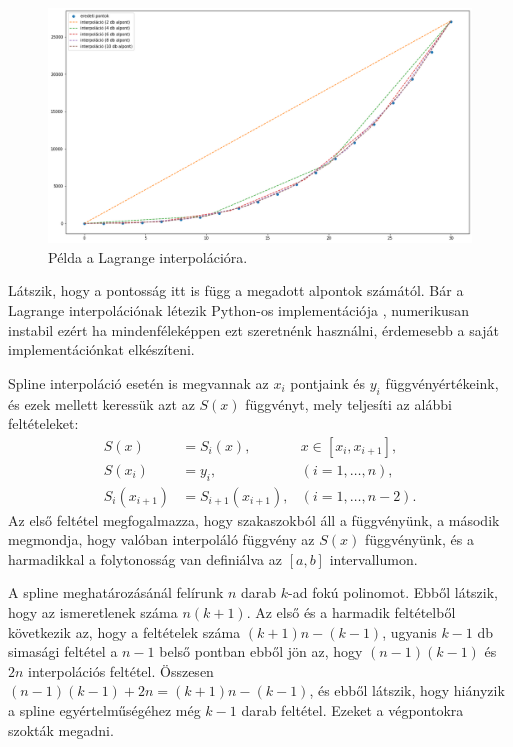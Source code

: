 \begin{figure}[h!]
\centering
\includegraphics[width=\textwidth]{img/lagrange.png}
\caption{Példa a Lagrange interpolációra.}
\label{fig:lagrange}
\end{figure}
    
    Látszik, hogy a pontosság itt is függ a megadott alpontok számától. Bár a
Lagrange interpolációnak létezik Python-os implementációja , numerikusan
instabil ezért ha mindenféleképpen ezt szeretnénk használni, érdemesebb a
saját implementációnkat elkészíteni.


    Spline interpoláció esetén is megvannak az \(x_i\) pontjaink és \(y_i\)
függvényértékeink, és ezek mellett keressük azt az \(S(x)\) függvényt,
mely teljesíti az alábbi feltételeket:
\begin{align*}
S(x) &= S_i(x), &x\in[x_i, x_{i+1}],\\
S(x_i) &= y_i, &(i=1, \dots, n),\\
S_i(x_{i+1}) &= S_{i+1}(x_{i+1}), &(i=1, \dots, n-2).
\end{align*}
    Az első feltétel megfogalmazza, hogy szakaszokból áll a függvényünk, a
második megmondja, hogy valóban interpoláló függvény az \(S(x)\)
függvényünk, és a harmadikkal a folytonosság van definiálva az \([a, b]\)
intervallumon.

    A spline meghatározásánál felírunk \(n\) darab \(k\)-ad fokú polinomot.
Ebből látszik, hogy az ismeretlenek száma \(n(k + 1)\). Az első és a
harmadik feltételből következik az, hogy a feltételek száma
\((k+1)n-(k-1)\), ugyanis \(k-1\) db simasági feltétel a \(n-1\) belső
pontban ebből jön az, hogy \((n-1)(k-1)\) és \(2n\) interpolációs
feltétel. Összesen \((n-1)(k-1)+2n=(k+1)n-(k-1)\), és ebből látszik, hogy
hiányzik a spline egyértelműségéhez még \(k-1\) darab feltétel. Ezeket a
végpontokra szokták megadni.

